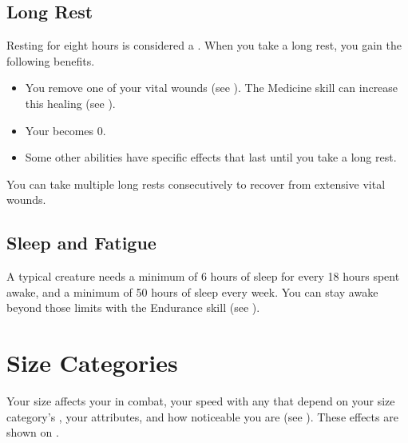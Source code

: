     \subsection{Long Rest}\label{Long Rest}
        Resting for eight hours is considered a .
        When you take a long rest, you gain the following benefits.
        \begin{itemize}
            \item You remove one of your vital wounds (see ).
                The Medicine skill can increase this healing (see ).
            \item Your  becomes 0.
            \item Some other abilities have specific effects that last until you take a long rest.
        \end{itemize}

        You can take multiple long rests consecutively to recover from extensive vital wounds.

    \subsection{Sleep and Fatigue}\label{Sleep and Fatigue}
        A typical creature needs a minimum of 6 hours of sleep for every 18 hours spent awake, and a minimum of 50 hours of sleep every week.
        You can stay awake beyond those limits with the Endurance skill (see ).

\section{Size Categories}\label{Size Categories}
    Your size affects your  in combat, your speed with any  that depend on your size category's , your attributes, and how noticeable you are (see ).
    These effects are shown on .

